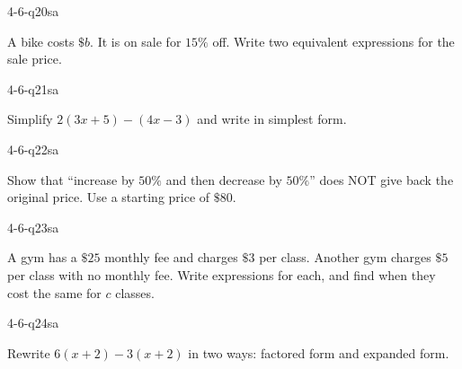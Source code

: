 \begin{practiceQuestion}{4-6-q20}{sa}
\begin{questionText}
A bike costs $\$b$. It is on sale for $15\%$ off. Write two equivalent expressions for the sale price.
\end{questionText}
\end{practiceQuestion}

\begin{practiceQuestion}{4-6-q21}{sa}
\begin{questionText}
Simplify $2(3x + 5) - (4x - 3)$ and write in simplest form.
\end{questionText}
\end{practiceQuestion}

\begin{practiceQuestion}{4-6-q22}{sa}
\begin{questionText}
Show that ``increase by $50\%$ and then decrease by $50\%$'' does NOT give back the original price. Use a starting price of $\$80$.
\end{questionText}
\end{practiceQuestion}

\begin{practiceQuestion}{4-6-q23}{sa}
\begin{questionText}
A gym has a $\$25$ monthly fee and charges $\$3$ per class. Another gym charges $\$5$ per class with no monthly fee. Write expressions for each, and find when they cost the same for $c$ classes.
\end{questionText}
\end{practiceQuestion}

\begin{practiceQuestion}{4-6-q24}{sa}
\begin{questionText}
Rewrite $6(x + 2) - 3(x + 2)$ in two ways: factored form and expanded form.
\end{questionText}
\end{practiceQuestion}

